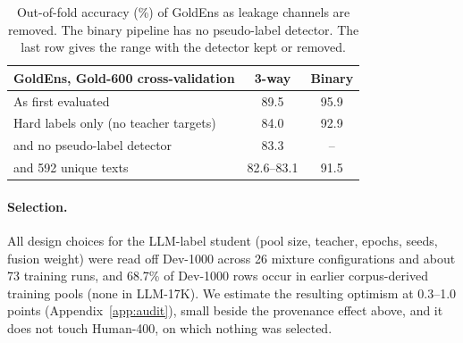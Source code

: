 \begin{table}[t]
\centering
\small
\setlength{\tabcolsep}{4pt}
\begin{tabular}{@{}lcc@{}}
\toprule
GoldEns, Gold-600 cross-validation & 3-way & Binary \\
\midrule
As first evaluated & 89.5 & 95.9 \\
Hard labels only (no teacher targets) & 84.0 & 92.9 \\
\quad and no pseudo-label detector & 83.3 & -- \\
\quad and 592 unique texts & 82.6--83.1 & 91.5 \\
\bottomrule
\end{tabular}
\caption{Out-of-fold accuracy (\%) of GoldEns as leakage channels are
removed. The binary pipeline has no pseudo-label detector. The last
row gives the range with the detector kept or removed.}
\label{tab:oof}
\end{table}

\paragraph{Selection.}
All design choices for the LLM-label student (pool size, teacher,
epochs, seeds, fusion weight) were read off Dev-1000 across 26
mixture configurations and about 73 training runs, and 68.7\% of
Dev-1000 rows occur in earlier corpus-derived training pools (none in
LLM-17K). We estimate the resulting optimism at 0.3--1.0 points
(Appendix~\ref{app:audit}), small beside the provenance effect above,
and it does not touch Human-400, on which nothing was selected.
